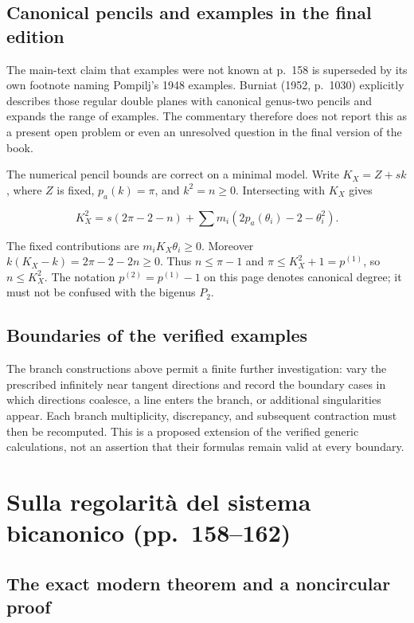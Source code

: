 \subsection{Canonical pencils and examples in the final edition}

The main-text claim that examples were not known at p.~158 is superseded by its own footnote naming Pompilj's 1948 examples. Burniat (1952, p.~1030) explicitly describes those regular double planes with canonical genus-two pencils and expands the range of examples. The commentary therefore does not report this as a present open problem or even an unresolved question in the final version of the book.

The numerical pencil bounds are correct on a minimal model. Write \(K_X=Z+sk\), where \(Z\) is fixed, \(p_a(k)=\pi\), and \(k^2=n\ge 0\). Intersecting with \(K_X\) gives

\[
K_X^2=s(2\pi-2-n)+\sum m_i(2p_a(\theta_i)-2-\theta_i^2).
\]

The fixed contributions are \(m_i K_X\theta_i\ge 0\). Moreover \(k(K_X-k)=2\pi-2-2 n\ge 0\). Thus \(n\le\pi-1\) and \(\pi\le K_X^2+1=p^{(1)}\), so \(n\le K_X^2\). The notation \(p^{(2)}=p^{(1)}-1\) on this page denotes canonical degree; it must not be confused with the bigenus \(P_2\).

\subsection{Boundaries of the verified examples}

The branch constructions above permit a finite further investigation: vary the prescribed infinitely near tangent directions and record the boundary cases in which directions coalesce, a line enters the branch, or additional singularities appear. Each branch multiplicity, discrepancy, and subsequent contraction must then be recomputed. This is a proposed extension of the verified generic calculations, not an assertion that their formulas remain valid at every boundary.

\section[Regolarità del sistema bicanonico]{Sulla regolarità del sistema bicanonico (pp.~158--162)}\label{enriques-iv-19}

\subsection{The exact modern theorem and a noncircular proof}

